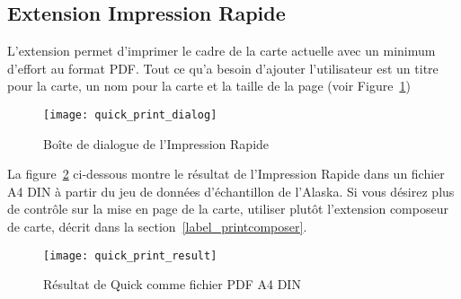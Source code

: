 \subsection{Extension Impression Rapide}


L'extension  permet d'imprimer le cadre de
la carte actuelle avec un minimum d'effort au format PDF. Tout ce qu'a besoin
d'ajouter l'utilisateur est un titre pour la carte, un nom pour la carte et la
taille de la page (voir Figure~\ref{fig:quickprint})
 
\begin{figure}[ht]
   \begin{center}
   \caption{Bo\^ite de dialogue de l'Impression Rapide
\nixcaption}\label{fig:quickprint}\smallskip
   \texttt{[image: quick\_print\_dialog]}
\end{center}
\end{figure}

La figure~\ref{fig:quickprint_result} ci-dessous montre le r\'esultat de l'Impression Rapide dans un fichier A4 DIN \`a partir du jeu de donn\'ees d'\'echantillon de
l'Alaska. Si vous d\'esirez plus de contr\^ole sur la mise en page de la carte,
utiliser plut\^ot l'extension composeur de carte, d\'ecrit dans la
section~\ref{label_printcomposer}.

\begin{figure}[ht]
   \begin{center}
   \caption{R\'esultat de Quick comme fichier PDF A4 DIN
\nixcaption}\label{fig:quickprint_result}\smallskip
   \texttt{[image: quick\_print\_result]}
\end{center}
\end{figure}